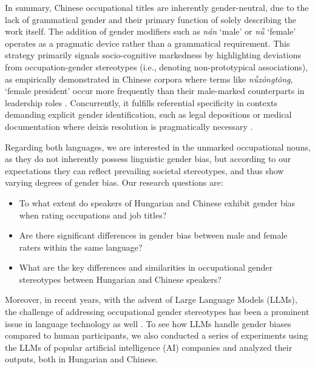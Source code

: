 \documentclass[11pt]{article}
\newcommand{\zh}[1]{\simplifiedchinesefont{#1}\rmfamily}
\begin{document}
In summary, Chinese occupational titles are inherently gender-neutral, due to the lack of grammatical gender and their primary function of solely describing the work itself. The addition of gender modifiers such as \zh{男} \textit{nán} `male' or \zh{女} \textit{nǚ} `female' operates as a pragmatic device rather than a grammatical requirement. This strategy primarily signals socio-cognitive markedness by highlighting deviations from occupation-gender stereotypes (i.e., denoting non-prototypical associations), as empirically demonstrated in Chinese corpora where terms like \zh{女总统} \textit{nǚzóngtǒng}, `female president' occur more frequently than their male-marked counterparts in leadership roles \citep{su_2021_occupational,farris_1988_gender}. Concurrently, it fulfills referential specificity in contexts demanding explicit gender identification, such as legal depositions or medical documentation where deixis resolution is pragmatically necessary \citep{hellinger_2003_gender,stahlberg_2011_representation}.


Regarding both languages, we are interested in the unmarked occupational nouns, as they do not inherently possess linguistic gender bias, but according to our expectations they can reflect prevailing societal stereotypes, and thus show varying degrees of gender bias. Our research questions are: 
\begin{itemize}
  \item To what extent do speakers of Hungarian and Chinese exhibit gender bias when rating occupations and job titles?
  \item Are there significant differences in gender bias between male and female raters within the same language?
  \item What are the key differences and similarities in occupational gender stereotypes between Hungarian and Chinese speakers?
\end{itemize}

Moreover, in recent years, with the advent of Large Language Models (LLMs), the challenge of addressing occupational gender stereotypes has been a prominent issue in language technology as well \citep[cf.][]{kirk_2021_bias,ju_2024_female,an_2025_mutual}. To see how LLMs handle gender biases compared to human participants, we also conducted a series of experiments using the LLMs of popular artificial intelligence (AI) companies and analyzed their outputs, both in Hungarian and Chinese.

\end{document}
